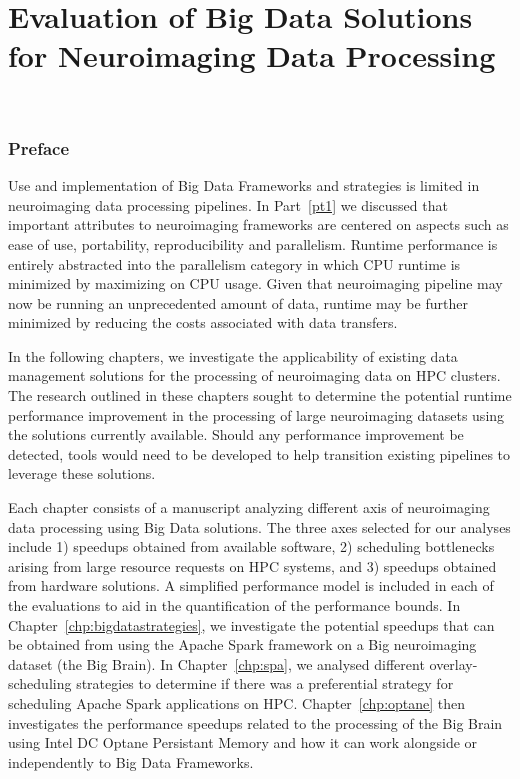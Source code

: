 \part{Evaluation of Big Data Solutions for Neuroimaging Data Processing}~\label{part:evaluation}
\section*{Preface}
Use and implementation of Big Data Frameworks and strategies is limited in
neuroimaging data processing pipelines. In Part~\ref{pt1} we discussed
that important attributes to neuroimaging frameworks are centered on aspects
such as ease of use, portability, reproducibility and parallelism. Runtime performance
is entirely abstracted into the parallelism category in which CPU runtime is minimized
by maximizing on CPU usage. Given that neuroimaging pipeline may now be running an unprecedented
amount of data, runtime may be further minimized by reducing the costs associated with data
transfers.

In the following chapters, we investigate the applicability of existing data management
solutions for the processing of neuroimaging data on HPC clusters. The research outlined
in these chapters sought to determine the potential runtime performance
improvement in the processing of large neuroimaging datasets using the solutions currently
available. Should any performance improvement be detected, tools would need to be developed
to help transition existing pipelines to leverage these solutions.

Each chapter consists of a manuscript analyzing different axis of neuroimaging data processing
using Big Data solutions. The three axes selected for our analyses include 1) speedups obtained
from available software, 2) scheduling bottlenecks arising from large resource requests on HPC systems, and
3) speedups obtained from hardware solutions. A simplified performance model is included in 
each of the evaluations to aid in the quantification of the performance bounds.
In Chapter~\ref{chp:bigdatastrategies},
we investigate the potential speedups that can be obtained from using the Apache Spark
framework on a Big neuroimaging dataset (the Big Brain). In Chapter~\ref{chp:spa}, 
we analysed different overlay-scheduling strategies to determine if there was a 
preferential strategy for scheduling Apache Spark applications on HPC. Chapter~\ref{chp:optane}
then investigates the performance speedups related to the processing of the Big Brain using
Intel DC Optane Persistant Memory and how it can work alongside or independently to Big Data
Frameworks.  